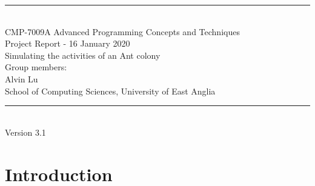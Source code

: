 \documentclass[a4paper, oneside, 11pt]{report}
\begin{document}
\begin{titlepage}
\begin{center}
\rule{12cm}{1mm} \\
\vspace{1cm}
{\large  CMP-7009A Advanced Programming Concepts and Techniques}
\vspace{7.5cm}
\\{\Large Project Report - 16 January 2020}
\vspace{1.5cm}
\\{\LARGE Simulating the activities of an Ant colony}
\vspace{1.0cm}
\\{\Large Group members: \\ Alvin Lu}
\vspace{10.0cm}
\\{\large School of Computing Sciences, University of East Anglia}
\\ \rule{12cm}{0.5mm}
\\ \hspace{8.5cm} {\large Version 3.1}
\end{center}
\end{titlepage}


\setcounter{page}{1}


\begin{abstract}
Ants have always been a popular animal that was researched for it's behaviour. Findings from it has benefited areas such as machine learning, algorithm discovery and server optimisation. This project aims to create a realistic ant simulator that can be used be researchers and educators to discover potential behaviours or run simple simulations for demonstrations and research.  The result was an Ant simulator that provides customisation of various environmental and ant values that can be controlled at the users pace. Variables such as birth rate and death rate can be changed before the start of a simulation. It uses an intelligent ant path-finding algorithm that utilises surrounding pheromone data, distance from hive and individual memory. The system is replicable and flexible, which could potentially encourage reuse and expansion in the future.
\end{abstract}

\chapter{Introduction}
\label{chap:intro}
\end{document}

